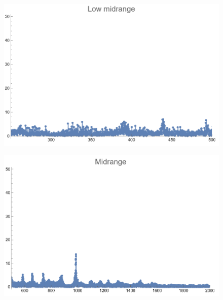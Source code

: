 \documentclass[12pt, letterpaper]{article}
\begin{document}
\begin{figure}[H]
  \centering
  \begin{minipage}{.5\textwidth}
    \centering
    \includegraphics[width=.9\linewidth]{imgs/Cancion5/lowmid.png}
    \label{fig:05d}
  \end{minipage}%
  \begin{minipage}{.5\textwidth}
    \centering
    \includegraphics[width=.9\linewidth]{imgs/Cancion5/mid.png}
    \label{fig:05e}
  \end{minipage}
\end{figure}
\end{document}
